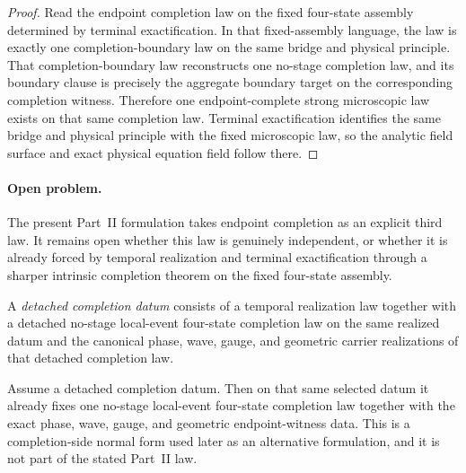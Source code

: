 \begin{proof}
Read the endpoint completion law on the fixed four-state assembly
determined by terminal exactification. In that fixed-assembly language, the
law is exactly one completion-boundary law on the same bridge and physical
principle. That completion-boundary law reconstructs one no-stage completion
law, and its boundary clause is precisely the aggregate boundary target on the
corresponding completion witness. Therefore one endpoint-complete
strong microscopic law exists on that same completion law. Terminal
exactification identifies the same bridge and physical principle with the
fixed microscopic law, so the analytic field surface and exact
physical equation field follow there.
\end{proof}

\paragraph{Open problem.}
The present Part~II formulation takes endpoint completion as an explicit third
law. It remains open whether this law is genuinely independent, or whether it
is already forced by temporal realization and terminal exactification through
a sharper intrinsic completion theorem on the fixed four-state assembly.

\begin{definition}
\label{def:temporal-flagship-package}
A \emph{detached completion datum} consists of a temporal realization law
together with a detached no-stage local-event four-state completion law on the
same realized datum and the canonical phase, wave, gauge, and geometric carrier
realizations of that detached completion law.
\end{definition}

\begin{theorem}
\label{thm:completion-side-normal-form-of-the-temporal-realization-law}
Assume a detached completion datum. Then on that same selected datum it already
fixes one no-stage local-event four-state completion law together with the
exact phase, wave, gauge, and geometric endpoint-witness data. This is a
completion-side normal form used later as an alternative formulation, and it is
not part of the stated Part~II law.
\end{theorem}


